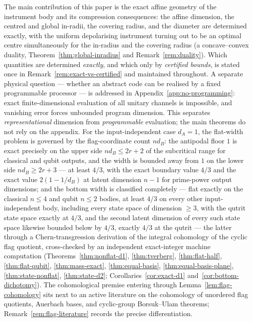\documentclass[11pt,a4paper]{article}
\begin{document}
The main contribution of this paper is the exact affine geometry of the instrument body and its compression consequences: the affine dimension, the centred and global in-radii, the covering radius, and the diameter are determined exactly, with the uniform depolarising instrument turning out to be an optimal centre simultaneously for the in-radius and the covering radius (a concave--convex duality, Theorem~\ref{thm:global-inradius} and Remark~\ref{rem:duality}). Which quantities are determined \emph{exactly}, and which only by \emph{certified bounds}, is stated once in Remark~\ref{rem:exact-vs-certified} and maintained throughout. A separate physical question --- whether an abstract code can be realised by a fixed programmable processor --- is addressed in Appendix~\ref{app:no-programming}: exact finite-dimensional evaluation of all unitary channels is impossible, and vanishing error forces unbounded program dimension. This separates \emph{representational} dimension from \emph{programmable} evaluation; the main theorems do not rely on the appendix. For the input-independent case $d_A=1$, the flat-width problem is governed by the flag-coordinate count $nd_B$: the antipodal floor $1$ is exact precisely on the upper side $nd_B\le2r+2$ of the subcritical range for classical and qubit outputs, and the width is bounded away from $1$ on the lower side $nd_B\ge2r+3$ --- at least $4/3$, with the exact boundary value $4/3$ and the exact value $2(1-1/d_B)$ at latent dimension $n-1$ for prime-power output dimensions; and the bottom width is classified completely --- flat exactly on the classical $n\le4$ and qubit $n\le2$ bodies, at least $4/3$ on every other input-independent body, including every state space of dimension $\ge3$, with the qutrit state space exactly at $4/3$, and the second latent dimension of every such state space likewise bounded below by $4/3$, exactly $4/3$ at the qutrit --- the latter through a Chern-transgression derivation of the integral cohomology of the cyclic flag quotient, cross-checked by an independent exact-integer machine computation (Theorems~\ref{thm:nonflat-d1}, \ref{thm:tverberg}, \ref{thm:flat-half}, \ref{thm:flat-qubit}, \ref{thm:mass-exact}, \ref{thm:equal-basis}, \ref{thm:equal-basis-plane}, \ref{thm:state-nonflat}, \ref{thm:state-d2}; Corollaries~\ref{cor:exact-d1} and~\ref{cor:bottom-dichotomy}). The cohomological premise entering through Lemma~\ref{lem:flag-cohomology} sits next to an active literature on the cohomology of unordered flag quotients, Auerbach bases, and cyclic-group Borsuk--Ulam theorems; Remark~\ref{rem:flag-literature} records the precise differentiation.
\end{document}
